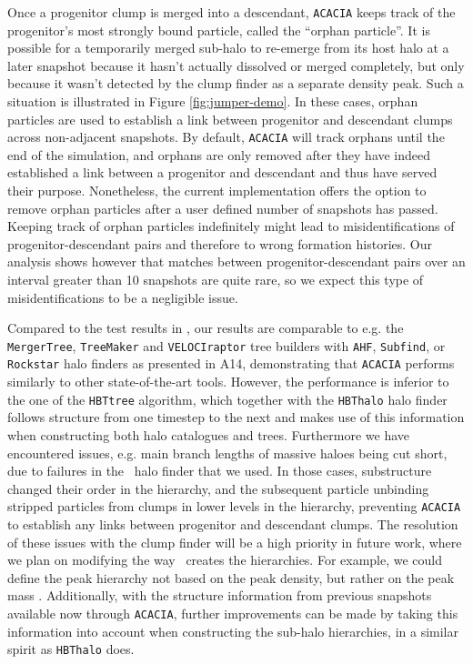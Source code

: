 Once a progenitor  clump is merged into  a descendant, \texttt{ACACIA}
keeps track of the progenitor's most strongly bound particle, called the
``orphan particle''.  It is possible for a temporarily merged sub-halo
to re-emerge from its host halo  at a later snapshot because it hasn't
actually dissolved  or merged completely,  but only because  it wasn't
detected  by the  clump finder  as a  separate density  peak.  Such  a
situation  is illustrated  in Figure  \ref{fig:jumper-demo}. In  these
cases,  orphan  particles  are  used   to  establish  a  link  between
progenitor  and  descendant   clumps  across  non-adjacent  snapshots.
By  default, \texttt{ACACIA} will track orphans until the end of the
simulation, and orphans are only removed after they have indeed established
a link between a progenitor and descendant and thus have served their
purpose. Nonetheless, the current implementation
offers the option to remove orphan particles after a user defined number
of snapshots has passed. Keeping track of orphan particles indefinitely
might lead to misidentifications of progenitor-descendant pairs and
therefore to wrong formation histories. Our analysis shows however that
matches between progenitor-descendant pairs over an interval greater
than 10 snapshots are quite rare, so we expect this type of
misidentifications to be a negligible issue.

Compared to the test results in \citet{SUSSING_HALOFINDER}, our results
are comparable to e.g. the \texttt{MergerTree}, \texttt{TreeMaker} and
\texttt{VELOCIraptor} tree builders with \texttt{AHF}, \texttt{Subfind},
or \texttt{Rockstar} halo finders as presented in A14, demonstrating that
\texttt{ACACIA} performs similarly to other state-of-the-art tools.
However, the performance is inferior to the one of the \texttt{HBTtree}
algorithm, which together with the \texttt{HBThalo} halo finder follows
structure from one timestep to the next and makes use of this information
when constructing both halo catalogues and trees. Furthermore we have encountered issues, e.g. main branch lengths of massive haloes being cut
short, due to failures in the \phew\ halo finder that we used. In those
cases, substructure changed their order in the hierarchy, and the subsequent
particle unbinding stripped particles from clumps in lower levels in the
hierarchy, preventing \texttt{ACACIA} to establish any links between
progenitor and descendant clumps. The resolution of these issues with the
clump finder will be a high priority in future work, where we plan on
modifying the way \phew\ creates the hierarchies.
For example, we could define the peak hierarchy not based on the peak
density, but rather on the peak mass \citep[e.g. similarly to \texttt{AdapdaHOP},][]{aubertOriginImplicationsDark2004a}. Additionally,
with the structure information from previous snapshots available now through
\texttt{ACACIA}, further improvements can be made by taking this information
into account when constructing the sub-halo hierarchies, in a similar spirit
as \texttt{HBThalo} does.

